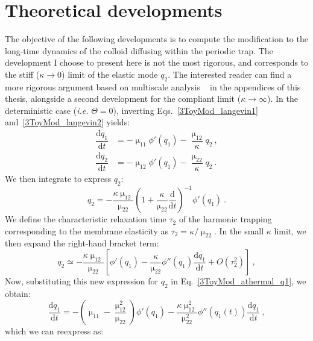 \section{Theoretical developments}
The objective of the following developments is to compute the modification to the long-time dynamics of the colloid diffusing within the periodic trap. The development I choose to present here is not the most rigorous, and corresponds to the stiff ($\kappa \to 0$) limit of the elastic mode $q_2$. The interested reader can find a more rigorous argument based on multiscale analysis ~\cite{hai2008, pav2008} in the appendices of this thesis, alongside a second development for the compliant limit ($\kappa \to \infty$). In the deterministic case (\emph{i.e.} $\Theta = 0$), inverting Eqs.~\ref{3ToyMod_langevin1} and~\ref{3ToyMod_langevin2} yields:
\begin{align}
    \label{3ToyMod_athermal_q1}
    \dfrac{\mathrm{d}q_1}{\mathrm{d}t} & = -\upmu_{11} \phi'(q_1) - \dfrac{\upmu_{12}}{\kappa}q_2~, \\
    \dfrac{\mathrm{d}q_2}{\mathrm{d}t} & = -\upmu_{12} \phi'(q_1) - \dfrac{\upmu_{22}}{\kappa}q_2~. 
\end{align}
We then integrate to express $q_2$:
\begin{equation}
    q_2 = - \dfrac{\kappa \upmu_{12}}{\upmu_{22}} \left( 1 + \dfrac{\kappa}{\upmu_{22}} \dfrac{\mathrm{d}}{\mathrm{d}t}\right)^{-1} \phi'(q_1)~.
\end{equation}
We define the characteristic relaxation time $\tau_2$ of the harmonic trapping corresponding to the membrane elasticity as $\tau_2 = \kappa/\upmu_{22}$.  In the small $\kappa$ limit, we then expand the right-hand bracket term:
\begin{equation}
    q_2 \simeq - \dfrac{\kappa \upmu_{12}}{\upmu_{22}} \left[ \phi'(q_1) - \dfrac{\kappa}{\upmu_{22}}\phi''(q_1) \dfrac{\mathrm{d}q_1}{\mathrm{d}t} + O(\tau_2^2)\right]~,
\end{equation}
Now, substituting this new expression for $q_2$ in Eq.~\ref{3ToyMod_athermal_q1}, we obtain:
\begin{equation}
     \dfrac{\mathrm{d}q_1}{\mathrm{d}t} = - \left( \upmu_{11} - \dfrac{\upmu_{12}^2}{\upmu_{22}}\right) \phi'(q_1) - \dfrac{\kappa \upmu_{12}^2}{\upmu_{22}^2} \phi''(q_1(t)) \dfrac{\mathrm{d}q_1}{\mathrm{d}t}~,
\end{equation}
which we can reexpress as:
